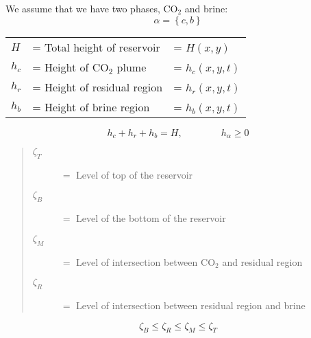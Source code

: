\documentclass[12pt]{scrartcl}
\newcommand{\mth}[1]{\ensuremath{#1}\xspace}
\newcommand{\COO}{\mth{\mathrm{CO}_2}}
\newcommand{\Hei}{H}        %
\newcommand{\hei}{h}        %
\newcommand{\tim}{t}        %
\newcommand{\phs}{\alpha}   %
\newcommand{\Lev}{\zeta}    %
\newcommand{\Top}{T}        %
\newcommand{\Bot}{B}        %
\newcommand{\Res}{R}        %
\newcommand{\Mob}{M}        %
\newcommand{\nap}{c}        %
\newcommand{\wet}{b}        %
\newcommand{\res}{r}        %
\newcommand{\x}{x}
\newcommand{\y}{y}
\newcommand{\LevT}{\Lev_\Top}
\newcommand{\LevB}{\Lev_\Bot}
\newcommand{\LevM}{\Lev_\Mob}
\newcommand{\LevR}{\Lev_\Res}
\newcommand{\hphs}{\hei_\phs}
\newcommand{\hnap}{\hei_\nap}
\newcommand{\hres}{\hei_\res}
\newcommand{\hwet}{\hei_\wet}
\begin{document}
We assume that we have two phases, \COO and brine:
\begin{equation}
\phs = \left\{ \nap, \wet \right\}
\end{equation}

\begin{tabular}{lll}
\( \Hei  \) & = Total height of reservoir & = \( \Hei \left( \x, \y \right)        \) \\
\( \hnap \) & = Height of \COO plume      & = \( \hnap \left( \x, \y, \tim \right) \) \\
\( \hres \) & = Height of residual region & = \( \hres \left( \x, \y, \tim \right) \) \\
\( \hwet \) & = Height of brine region    & = \( \hwet \left( \x, \y, \tim \right) \) \\
\end{tabular}

\begin{equation}
\hnap + \hres + \hwet = \Hei, \qquad \qquad \hphs \geq 0
\end{equation}

\begin{quote}
\begin{description}
\item[\( \LevT \)] \(=\) Level of top of the reservoir
\item[\( \LevB \)] \(=\) Level of the bottom of the reservoir
\item[\( \LevM \)] \(=\) Level of intersection between \COO and residual region
\item[\( \LevR \)] \(=\) Level of intersection between residual region and brine
\end{description}
\end{quote}

\begin{equation}
\LevB \leq \LevR \leq \LevM \leq \LevT
\end{equation}
\end{document}
